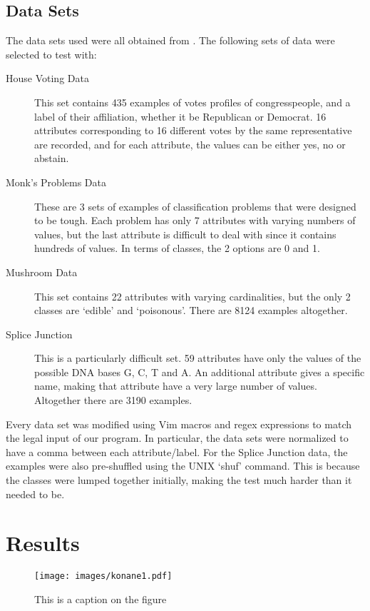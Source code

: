 \documentclass[12pt, letterpaper]{article}
\begin{document}
\subsection*{Data Sets}
The data sets used were all obtained from \cite{ucimll}. The following sets of data were selected to test with:
\begin{description}
    \item[House Voting Data] This set contains 435 examples of votes profiles of congresspeople, and a label of their affiliation, whether it be Republican or Democrat. 16 attributes corresponding to 16 different votes by the same representative are recorded, and for each attribute, the values can be either yes, no or abstain.
    \item[Monk's Problems Data] These are 3 sets of examples of classification problems that were designed to be tough. Each problem has only 7 attributes with varying numbers of values, but the last attribute is difficult to deal with since it contains hundreds of values. In terms of classes, the 2 options are 0 and 1.
    \item[Mushroom Data] This set contains 22 attributes with varying cardinalities, but the only 2 classes are `edible' and `poisonous'. There are 8124 examples altogether.
    \item[Splice Junction] This is a particularly difficult set. 59 attributes have only the values of the possible DNA bases G, C, T and A. An additional attribute gives a specific name, making that attribute have a very large number of values. Altogether there are 3190 examples.
\end{description}

Every data set was modified using Vim macros and regex expressions to match the legal input of our program. In particular, the data sets were normalized to have a comma between each attribute/label. For the Splice Junction data, the examples were also pre-shuffled using the UNIX `shuf' command. This is because the classes were lumped together initially, making the test much harder than it needed to be.

\section{Results}
\begin{figure}
\begin{center}
\texttt{[image: images/konane1.pdf]}
\end{center}
\caption{This is a caption on the figure}
\label{somefigure}
\end{figure}
\end{document}
